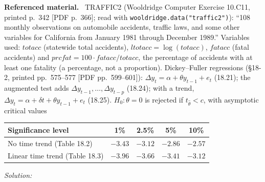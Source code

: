 \documentclass[11pt,a4paper]{article}
\newif\ifsolucoes
\newcommand{\espacoresol}{4.5cm}   %
\newenvironment{refmat}{\par\smallskip\noindent\begin{minipage}{\linewidth}\small\textbf{Referenced material.}~}{\end{minipage}\par\smallskip}
\newcommand{\resolespaco}{\ifsolucoes\else\par\textit{Solution:}\vspace{\espacoresol}\par\fi}
\begin{document}
\begin{refmat}
TRAFFIC2 (Wooldridge Computer Exercise 10.C11, printed p.~342 [PDF p.~366]; read with
\texttt{wooldridge.data("traffic2")}): ``108 monthly observations on automobile accidents, traffic laws,
and some other variables for California from January 1981 through December 1989.'' Variables used:
$totacc$ (statewide total accidents), $ltotacc=\log(totacc)$, $fatacc$ (fatal accidents) and
$prcfat=100\cdot fatacc/totacc$, the percentage of accidents with at least one fatality (a percentage, not a
proportion). Dickey--Fuller regressions (\S18-2, printed pp.~575--577 [PDF pp.~599--601]):
$\Delta y_t=\alpha+\theta y_{t-1}+e_t$ (18.21); the augmented test adds $\Delta y_{t-1},\dots,\Delta y_{t-p}$
(18.24); with a trend, $\Delta y_t=\alpha+\delta t+\theta y_{t-1}+e_t$ (18.25). $H_0\!:\theta=0$ is rejected if
$t_{\hat\theta}<c$, with asymptotic critical values
\begin{center}\small
\begin{tabular}{lcccc}
\toprule
Significance level & 1\% & 2.5\% & 5\% & 10\%\\
\midrule
No time trend (Table 18.2) & $-3.43$ & $-3.12$ & $-2.86$ & $-2.57$\\
Linear time trend (Table 18.3) & $-3.96$ & $-3.66$ & $-3.41$ & $-3.12$\\
\bottomrule
\end{tabular}
\end{center}
\end{refmat}
\resolespaco
\end{document}
